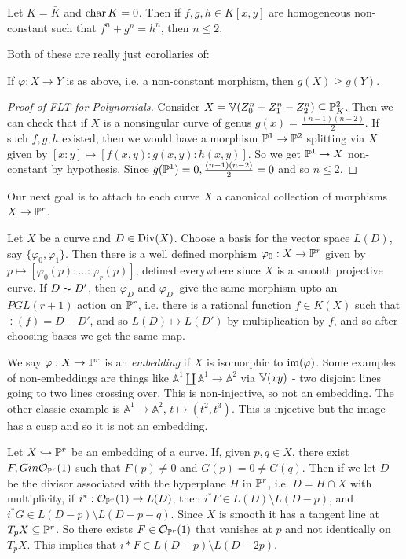\documentclass[10pt,a4paper,rgb]{article}
\newcommand{\A}{\mathbb{A}}
\begin{document}
\begin{theorem}
Let $K = \bar{K}$ and $\charr K = 0$. Then if $f,g,h \in K[x,y]$ are homogeneous non-constant such that $f^n + g^n = h^n$, then $n \leq 2$.
\end{theorem}
Both of these are really just corollaries of:
\begin{corollary}
If $\varphi: X \to Y$ is as above, i.e. a non-constant morphism, then $g(X) \geq g(Y)$.
\end{corollary}
\begin{proof}[Proof of FLT for Polynomials]
Consider $X = \V(Z_0^n + Z_1^n - Z_2^n) \subseteq \P^2_K$. Then we can check that if $X$ is a nonsingular curve of genus $g(x) = \frac{(n-1)(n-2)}{2}$. If such $f,g,h$ existed, then we would have a morphism $\P^1 \to \P^2$ splitting via $X$ given by $[x:y] \mapsto [f(x,y):g(x,y):h(x,y)]$. So we get $\P^1 \to X$ non-constant by hypothesis. Since $g(\P^1) = 0, \frac{(n-1)(n-2)}{2} = 0$ and so $n \leq 2$.
\end{proof}
Our next goal is to attach to each curve $X$ a canonical collection of morphisms $X \to \P^r$.

Let $X$ be a curve and $D \in \Div(X)$. Choose a basis for the vector space $L(D)$, say $\{\varphi_0, \varphi_1\}$. Then there is a well defined morphism $\varphi_0:X \to \P^r$ given by $p \mapsto [\varphi_0(p):\ldots:\varphi_r(p)]$, defined everywhere since $X$ is a smooth projective curve. If $D \thicksim D'$, then $\varphi_D$ and $\varphi_{D'}$ give the same morphism upto an $PGL(r+1)$ action on $\P^r$, i.e. there is a rational function $f \in K(X)$ such that $\div(f) = D-D'$, and so $L(D) \mapsto L(D')$ by multiplication by $f$, and so after choosing bases we get the same map.

We say $\varphi:X \to \P^r$ is an \emph{embedding} if $X$ is isomorphic to $\Image(\varphi)$. Some examples of non-embeddings are things like $\A^1 \coprod \A^1 \to \A^2$ via $\V(xy)$ - two disjoint lines going to two lines crossing over. This is non-injective, so not an embedding. The other classic example is $\A^1 \to \A^2$, $t \mapsto (t^2, t^3)$. This is injective but the image has a cusp and so it is not an embedding.

Let $X \injection \P^r$ be an embedding of a curve. If, given $p, q \in X$, there exist $F,G in \mathcal{O}_{\P^r}(1)$ such that $F(p) \neq 0$ and $G(p) = 0 \neq G(q)$. Then if we let $D$ be the divisor associated with the hyperplane $H$ in $\P^r$, i.e. $D = H \cap X$ with multiplicity, if $i^\ast:\mathcal{O}_{\P^r}(1) \to L(D)$, then $i^{\ast}F \in L(D)\setminus L(D-p)$, and $i^{\ast}G \in L(D-p)\setminus L(D-p-q)$. Since $X$ is smooth it has a tangent line at $T_pX \subseteq \P^r$. So there exists $F \in \mathcal{O}_{\P^r}(1)$ that vanishes at $p$ and not identically on $T_pX$. This implies that $i\ast F \in L(D-p)\setminus L(D-2p)$.
\end{document}
